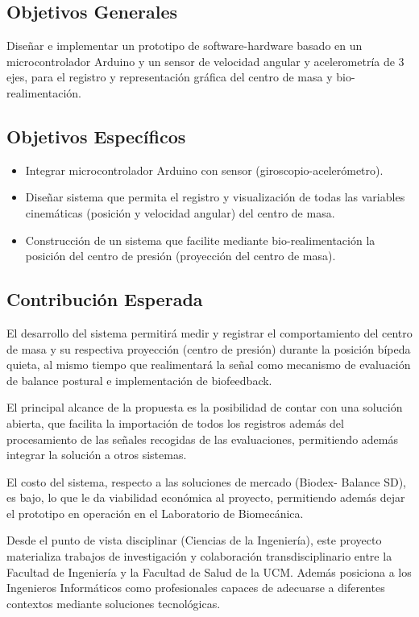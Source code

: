 \documentclass[12pt,a4paper]{article}
\begin{document}
\subsection{Objetivos Generales}
Diseñar e implementar un prototipo de software-hardware basado en un microcontrolador Arduino y un sensor de velocidad angular y acelerometría de 3 ejes, para el registro y representación gráfica del centro de masa y bio-realimentación.

\subsection{Objetivos Específicos}
\begin{itemize}
	\item Integrar microcontrolador Arduino con sensor (giroscopio-acelerómetro).
	\item Diseñar sistema que permita el registro y visualización de todas las variables cinemáticas (posición y velocidad angular) del centro de masa. 
	\item Construcción de un sistema que facilite mediante bio-realimentación la posición del centro de presión (proyección del centro de masa).
\end{itemize}	

\subsection{Contribución Esperada}

El desarrollo del sistema permitirá medir y registrar el comportamiento del centro de masa y su respectiva proyección (centro de presión) durante la posición bípeda quieta, al mismo tiempo que realimentará la señal como mecanismo de evaluación de balance postural e implementación de biofeedback.

El principal alcance de la propuesta es la posibilidad de contar con una solución abierta, que facilita la importación de todos los registros además del procesamiento de las señales recogidas de las evaluaciones, permitiendo además integrar la solución a otros sistemas.

El costo del sistema, respecto a las soluciones de mercado (Biodex- Balance SD), es bajo, lo que le da viabilidad económica al proyecto, permitiendo además dejar el prototipo en operación en el Laboratorio de Biomecánica. 

Desde el punto de vista disciplinar (Ciencias de la Ingeniería), este proyecto materializa trabajos de investigación y colaboración transdisciplinario entre la Facultad de Ingeniería y la Facultad de Salud de la UCM. Además posiciona a los Ingenieros Informáticos como profesionales capaces de adecuarse a diferentes contextos mediante soluciones tecnológicas.
\end{document}
